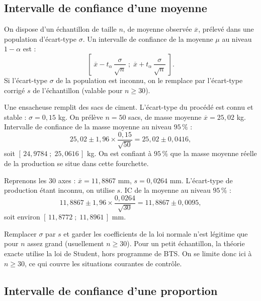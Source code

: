 \documentclass[a4paper,11pt]{article}
\begin{document}
\subsection{Intervalle de confiance d'une moyenne}

\begin{theoreme}
On dispose d'un échantillon de taille $n$, de moyenne observée $\overline{x}$, prélevé dans une population d'écart-type $\sigma$. Un intervalle de confiance de la moyenne $\mu$ au niveau $1-\alpha$ est :
\[
\boxed{\left[\;\overline{x} - t_\alpha\,\frac{\sigma}{\sqrt{n}}\;;\;\overline{x} + t_\alpha\,\frac{\sigma}{\sqrt{n}}\;\right].}
\]
Si l'écart-type $\sigma$ de la population est inconnu, on le remplace par l'écart-type corrigé $s$ de l'échantillon (valable pour $n \geq 30$).
\end{theoreme}

\begin{exemple}
Une ensacheuse remplit des sacs de ciment. L'écart-type du procédé est connu et stable : $\sigma = 0{,}15$ kg. On prélève $n = 50$ sacs, de masse moyenne $\overline{x} = 25{,}02$ kg. Intervalle de confiance de la masse moyenne au niveau $95\,\%$ :
\[
25{,}02 \pm 1{,}96 \times \frac{0{,}15}{\sqrt{50}} = 25{,}02 \pm 0{,}0416,
\]
soit $[\,24{,}9784\;;\;25{,}0616\,]$ kg. On est confiant à $95\,\%$ que la masse moyenne réelle de la production se situe dans cette fourchette.
\end{exemple}

\begin{exemple}[-- Diamètre d'axe ($\sigma$ inconnu, $n = 30$)]
Reprenons les $30$ axes : $\overline{x} = 11{,}8867$ mm, $s = 0{,}0264$ mm. L'écart-type de production étant inconnu, on utilise $s$. IC de la moyenne au niveau $95\,\%$ :
\[
11{,}8867 \pm 1{,}96 \times \frac{0{,}0264}{\sqrt{30}} = 11{,}8867 \pm 0{,}0095,
\]
soit environ $[\,11{,}8772\;;\;11{,}8961\,]$ mm.
\end{exemple}

\begin{remarque}
Remplacer $\sigma$ par $s$ et garder les coefficients de la loi normale n'est légitime que pour $n$ assez grand (usuellement $n \geq 30$). Pour un petit échantillon, la théorie exacte utilise la loi de Student, hors programme de BTS. On se limite donc ici à $n \geq 30$, ce qui couvre les situations courantes de contrôle.
\end{remarque}

\subsection{Intervalle de confiance d'une proportion}
\end{document}
